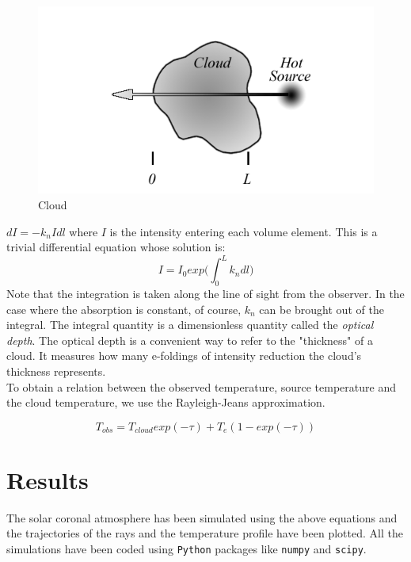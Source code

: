 \documentclass[journal]{IEEEtran}
\begin{document}
\begin{figure}[h!]
  \includegraphics[width=\linewidth]{cloud.png} 
  \caption{Cloud}
  \label{fig:result4}  
\end{figure}
 

$dI = - k_nIdl$ where $I$ is the intensity entering each volume element. This is a trivial
differential equation whose solution is:
$$ I = I_0exp\Big( \int_{0}^{L}k_ndl \Big) $$ 
Note that the integration is taken along the line of sight from the observer. In the case
where the absorption is constant, of course, $k_n$ can be brought out of the integral. The
integral quantity is a dimensionless quantity called the \emph{optical depth}. The optical depth is a convenient way to refer to the "thickness" of a cloud. It measures how
many e-foldings of intensity reduction the cloud's thickness represents. \\ 

To obtain a relation between the observed temperature, source temperature and the
cloud temperature, we use the Rayleigh-Jeans approximation.

$$ T_{obs} = T_{cloud}exp(-\tau) + T_{e}(1 - exp(-\tau)) $$

\newpage


\section{Results}
The solar coronal atmosphere has been simulated using the above equations and the trajectories of the rays and the temperature profile have been plotted. All the simulations have been coded using \texttt{Python} packages like \texttt{numpy} and \texttt{scipy}.  


\vspace{2em}
\end{document}
